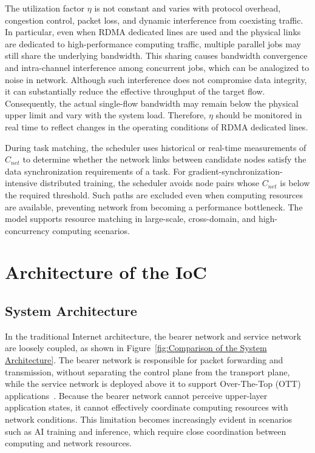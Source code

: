\documentclass{ccjnl}
\begin{document}
The utilization factor $\eta$ is not constant and varies with protocol overhead, congestion control, packet loss, and dynamic interference from coexisting traffic. In particular, even when RDMA dedicated lines are used and the physical links are dedicated to high-performance computing traffic, multiple parallel jobs may still share the underlying bandwidth. This sharing causes bandwidth convergence and intra-channel interference among concurrent jobs, which can be analogized to noise in network. Although such interference does not compromise data integrity, it can substantially reduce the effective throughput of the target flow. Consequently, the actual single-flow bandwidth may remain below the physical upper limit and vary with the system load. Therefore, $\eta$ should be monitored in real time to reflect changes in the operating conditions of RDMA dedicated lines.

During task matching, the scheduler uses historical or real-time measurements of $C_{net}$ to determine whether the network links between candidate nodes satisfy the data synchronization requirements of a task. For gradient-synchronization-intensive distributed training, the scheduler avoids node pairs whose $C_{net}$ is below the required threshold. Such paths are excluded even when computing resources are available, preventing network from becoming a performance bottleneck. The model supports resource matching in large-scale, cross-domain, and high-concurrency computing scenarios.

\section{Architecture of the IoC}
\label{s4}

\subsection{System Architecture}
\label{s4-1}

In the traditional Internet architecture, the bearer network and service network are loosely coupled, as shown in Figure~\ref{fig:Comparison of the System Architecture}. The bearer network is responsible for packet forwarding and transmission, without separating the control plane from the transport plane, while the service network is deployed above it to support Over-The-Top (OTT) applications~\cite{25}. Because the bearer network cannot perceive upper-layer application states, it cannot effectively coordinate computing resources with network conditions. This limitation becomes increasingly evident in scenarios such as AI training and inference, which require close coordination between computing and network resources.
\end{document}
